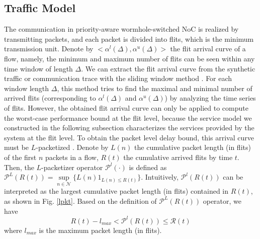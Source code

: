 \documentclass[preprint]{elsarticle}
\begin{document}
\subsection{Traffic Model}\label{traffic}
The communication in priority-aware wormhole-switched NoC is realized by transmitting packets, and each packet is divided into flits, which is the minimum transmission unit. Denote by $<\alpha^l(\Delta),\alpha^u(\Delta)>$ the flit arrival curve of a flow, namely, the minimum and maximum number of flits can be seen within any time window of length $\Delta$. We can extract the flit arrival curve from the synthetic traffic or communication trace with the sliding window method \cite{1253607}. For each window length $\Delta$, this method tries to find the maximal and minimal number of arrived flits (corresponding to $\alpha^l(\Delta)$ and $\alpha^u(\Delta)$) by analyzing the time series of flits. However, the obtained flit arrival curve can only be applied to compute the worst-case performance bound at the flit level, because the service model we constructed in the following subsection characterizes the services provided by the system at the flit level. To obtain the packet level delay bound, this arrival curve must be $L$-packetized \cite{Boudec2001Network}. Denote by $L(n)$ the cumulative packet length (in flits) of the first $n$ packets in a flow, $R(t)$ the cumulative arrived flits by time $t$. Then, the $L$-packetizer operator $\mathcal{P}^l(\cdot)$ is defined as $\mathcal{P}^L(R(t))=\underset{n\in\mathcal{N}}{\sup}\{L(n)1_{L(n)\leq R(t)}\}$. Intuitively, $\mathcal{P}^l(R(t))$ can be interpreted as the largest cumulative packet length (in flits) contained in $R(t)$, as shown in Fig. \ref{lpkt}. Based on the definition of $\mathcal{P}^L(R(t))$ operator, we have
\begin{equation}\label{prop}
R(t)-l_{max}<\mathcal{P}^l(R(t))\leq \mathcal{R}(t)
\end{equation}
where $l_{max}$ is the maximum packet length (in flits).
\end{document}
